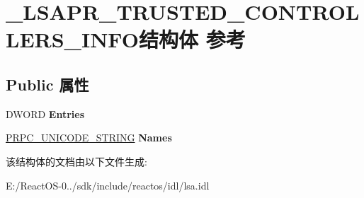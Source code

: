 \hypertarget{struct___l_s_a_p_r___t_r_u_s_t_e_d___c_o_n_t_r_o_l_l_e_r_s___i_n_f_o}{}\section{\+\_\+\+L\+S\+A\+P\+R\+\_\+\+T\+R\+U\+S\+T\+E\+D\+\_\+\+C\+O\+N\+T\+R\+O\+L\+L\+E\+R\+S\+\_\+\+I\+N\+F\+O结构体 参考}
\label{struct___l_s_a_p_r___t_r_u_s_t_e_d___c_o_n_t_r_o_l_l_e_r_s___i_n_f_o}
\subsection*{Public 属性}
\begin{DoxyCompactItemize}
\item 
\mbox{\label{struct___l_s_a_p_r___t_r_u_s_t_e_d___c_o_n_t_r_o_l_l_e_r_s___i_n_f_o_a4577c248a0ec2fa7b6f39dfad0269de2}} 
D\+W\+O\+RD {\bfseries Entries}
\item 
\mbox{\label{struct___l_s_a_p_r___t_r_u_s_t_e_d___c_o_n_t_r_o_l_l_e_r_s___i_n_f_o_ac51a365c8a44540f65bc4b2af0fb794c}} 
\hyperlink{struct___r_p_c___u_n_i_c_o_d_e___s_t_r_i_n_g}{P\+R\+P\+C\+\_\+\+U\+N\+I\+C\+O\+D\+E\+\_\+\+S\+T\+R\+I\+NG} {\bfseries Names}
\end{DoxyCompactItemize}


该结构体的文档由以下文件生成\+:\begin{DoxyCompactItemize}
\item 
E\+:/\+React\+O\+S-\/0../sdk/include/reactos/idl/lsa.\+idl\end{DoxyCompactItemize}

